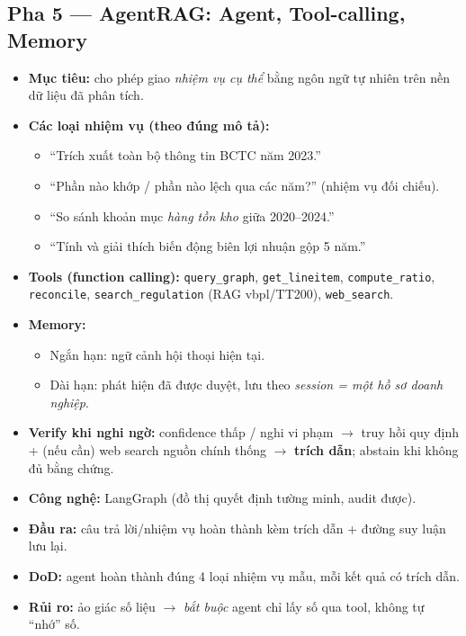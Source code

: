 \documentclass[11pt,a4paper]{article}
\newcommand{\pha}[1]{\subsection{#1}}
\begin{document}
\pha{Pha 5 --- AgentRAG: Agent, Tool-calling, Memory}
\begin{itemize}
  \item \textbf{Mục tiêu:} cho phép giao \emph{nhiệm vụ cụ thể} bằng ngôn ngữ tự nhiên trên nền dữ liệu đã phân tích.
  \item \textbf{Các loại nhiệm vụ (theo đúng mô tả):}
  \begin{itemize}
    \item ``Trích xuất toàn bộ thông tin BCTC năm 2023.''
    \item ``Phần nào khớp / phần nào lệch qua các năm?'' (nhiệm vụ đối chiếu).
    \item ``So sánh khoản mục \emph{hàng tồn kho} giữa 2020--2024.''
    \item ``Tính và giải thích biến động biên lợi nhuận gộp 5 năm.''
  \end{itemize}
  \item \textbf{Tools (function calling):} \texttt{query\_graph}, \texttt{get\_lineitem}, \texttt{compute\_ratio}, \texttt{reconcile}, \texttt{search\_regulation} (RAG vbpl/TT200), \texttt{web\_search}.
  \item \textbf{Memory:}
  \begin{itemize}
    \item Ngắn hạn: ngữ cảnh hội thoại hiện tại.
    \item Dài hạn: phát hiện đã được duyệt, lưu theo \emph{session = một hồ sơ doanh nghiệp}.
  \end{itemize}
  \item \textbf{Verify khi nghi ngờ:} confidence thấp / nghi vi phạm $\rightarrow$ truy hồi quy định + (nếu cần) web search nguồn chính thống $\rightarrow$ \textbf{trích dẫn}; abstain khi không đủ bằng chứng.
  \item \textbf{Công nghệ:} LangGraph (đồ thị quyết định tường minh, audit được).
  \item \textbf{Đầu ra:} câu trả lời/nhiệm vụ hoàn thành kèm trích dẫn + đường suy luận lưu lại.
  \item \textbf{DoD:} agent hoàn thành đúng 4 loại nhiệm vụ mẫu, mỗi kết quả có trích dẫn.
  \item \textbf{Rủi ro:} ảo giác số liệu $\rightarrow$ \emph{bắt buộc} agent chỉ lấy số qua tool, không tự ``nhớ'' số.
\end{itemize}
\end{document}
